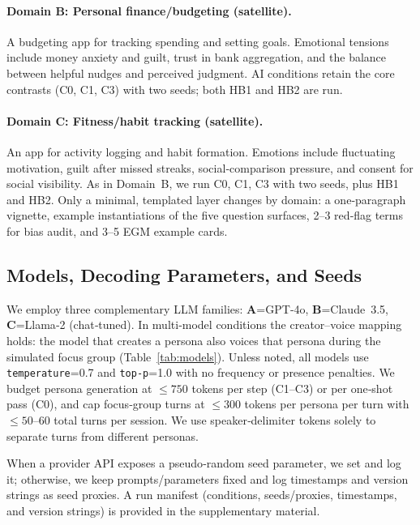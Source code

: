 \documentclass[acmsmall]{acmart}
\begin{document}
\paragraph{Domain B: Personal finance/budgeting (satellite).}
A budgeting app for tracking spending and setting goals. Emotional tensions include money anxiety and guilt, trust in bank aggregation, and the balance between helpful nudges and perceived judgment. AI conditions retain the core contrasts (C0, C1, C3) with two seeds; both HB1 and HB2 are run.


\paragraph{Domain C: Fitness/habit tracking (satellite).}
An app for activity logging and habit formation. Emotions include fluctuating motivation, guilt after missed streaks, social‑comparison pressure, and consent for social visibility. As in Domain~B, we run C0, C1, C3 with two seeds, plus HB1 and HB2. Only a minimal, templated layer changes by domain: a one‑paragraph vignette, example instantiations of the five question surfaces, 2--3 red‑flag terms for bias audit, and 3--5 EGM example cards. 


\subsection{Models, Decoding Parameters, and Seeds}
\label{sec:models-params-seeds}
We employ three complementary LLM families: \textbf{A}=GPT‑4o, \textbf{B}=Claude~3.5, \textbf{C}=Llama‑2 (chat‑tuned). In multi‑model conditions the creator–voice mapping holds: the model that creates a persona also voices that persona during the simulated focus group (Table~\ref{tab:models}). Unless noted, all models use \texttt{temperature}=0.7 and \texttt{top‑p}=1.0 with no frequency or presence penalties. We budget persona generation at $\leq 750$ tokens per step (C1--C3) or per one‑shot pass (C0), and cap focus‑group turns at $\leq 300$ tokens per persona per turn with $\leq 50$--$60$ total turns per session. We use speaker‑delimiter tokens solely to separate turns from different personas.

When a provider API exposes a pseudo‑random seed parameter, we set and log it; otherwise, we keep prompts/parameters fixed and log timestamps and version strings as seed proxies. A run manifest (conditions, seeds/proxies, timestamps, and version strings) is provided in the supplementary material.
\end{document}
